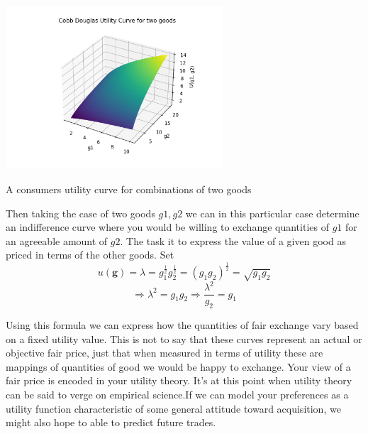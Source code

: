\documentclass{tufte-handout}
\begin{document}
\begin{marginfigure}
\includegraphics[width=3.2in, height=5.in]{Plots/cobb_douglas_utility.png}
\caption{A consumers utility curve for combinations of two goods}
\end{marginfigure} 

Then taking the case of two goods $g1, g2$ we can in this particular case determine an indifference curve where you would be willing to exchange quantities of $g1$ for an agreeable amount of $g2$. The task it to express the value of a given good as priced in terms of the other goods. Set 
$$u(\mathbf{g}) = \lambda =  g_{1}^{\frac{1}{2}}g_{2}^{\frac{1}{2}} = (g_{1}g_{2})^{\frac{1}{2}}  = \sqrt{g_{1}g_{2}}$$
$$ \Rightarrow \lambda^{2} = g_{1}g_{2} \Rightarrow \frac{\lambda^{2}}{g_{2}} = g_{1}$$

Using this formula we can express how the quantities of fair exchange vary based on a fixed utility value. This is not to say that these curves represent an actual or objective fair price, just that when measured in terms of utility these are mappings of quantities of good we would be happy to exchange. Your view of a fair price is encoded in your utility theory. It's at this point when utility theory can be said to verge on empirical science.If we can model your preferences as a utility function characteristic of some general attitude toward acquisition, we might also hope to able to predict future trades.  
\end{document}
